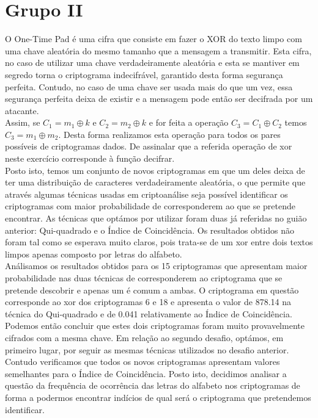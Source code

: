 \chapter{Grupo II}
O One-Time Pad é uma cifra que consiste em fazer o XOR do texto limpo com uma chave aleatória do mesmo tamanho que a mensagem a transmitir. Esta cifra, no caso de utilizar uma chave verdadeiramente aleatória e esta se mantiver em segredo torna o criptograma indecifrável, garantido desta forma segurança perfeita. Contudo, no caso de uma chave ser usada mais do que um vez, essa segurança perfeita deixa de existir e a mensagem pode então ser decifrada por um atacante.\\
Assim, se $C_1 = m_1 \oplus k$ e $C_2 = m_2 \oplus k$ e for feita a operação $C_3 = C_1 \oplus C_2$ temos $C_3 = m_1 \oplus m_2$. Desta forma realizamos esta operação para todos os pares possíveis de criptogramas dados. De assinalar que a referida operação de xor neste exercício corresponde à função decifrar.\\
Posto isto, temos um conjunto de novos criptogramas em que um deles deixa de ter uma distribuição de caracteres verdadeiramente aleatória, o que permite que através algumas técnicas usadas em criptoanálise seja possível identificar os criptogramas com maior probabilidade de corresponderem ao que se pretende encontrar. As técnicas que optámos por utilizar foram duas já referidas no guião anterior: Qui-quadrado e o Índice de Coincidência. Os resultados obtidos não foram tal como se esperava muito claros, pois trata-se de um xor entre dois textos limpos apenas composto por letras do alfabeto.\\
Análisamos os resultados obtidos para os 15 criptogramas que apresentam maior probabilidade nas duas técnicas de corresponderem ao criptograma que se pretende descobrir e apenas um é comum a ambas. O criptograma em questão corresponde ao xor dos criptogramas 6 e 18 e apresenta o valor de 878.14 na técnica do Qui-quadrado e de 0.041 relativamente ao Índice de Coincidência. Podemos então concluir que estes dois criptogramas foram muito provavelmente cifrados com a mesma chave. \newline \newline
Em relação ao segundo desafio, optámos, em primeiro lugar, por seguir as mesmas técnicas utilizados no desafio anterior. Contudo verificamos que todos os novos criptogramas apresentam valores semelhantes para o Índice de Coincidência. Posto isto, decidimos analisar a questão da frequência de ocorrência das letras do alfabeto nos criptogramas de forma a podermos encontrar indícios de qual será o criptograma que pretendemos identificar.\\ 
